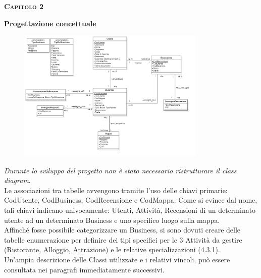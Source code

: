 \documentclass[a4paper,12pt]{article}
\begin{document}
\newpage 


\newpage\null{}\setcounter{page}{6}
\begin{flushleft}

\vspace*{+1cm}
\Large\textsc{\bf Capitolo 2}
\vspace*{+1cm}

\begingroup
\fontsize{30pt}{12pt}\selectfont\bf{Progettazione concettuale}
\endgroup
\vspace*{+1cm}
\end{flushleft}

\begin{center}
	\begin{figure}[h]
	\centering
 	\includegraphics[width=0.8\textwidth]{classDiagram.png}
	\end{figure}

\end{center}

\normalsize{
{\small \it* Durante lo sviluppo del progetto non è stato necessario ristrutturare il  class diagram}.
\vspace*{+0.2cm}
\\Le associazioni tra tabelle avvengono tramite l'uso delle chiavi primarie: CodUtente, CodBusiness, CodRecensione e CodMappa. Come si evince dal nome, tali chiavi indicano univocamente: Utenti, Attività, Recensioni di un determinato utente ad un determinato Business e uno specifico luogo sulla mappa.
\vspace*{+0.2cm}
\\Affinché fosse possibile categorizzare un Business, si sono dovuti creare delle tabelle enumerazione per definire dei tipi specifici per le 3 Attività da gestire (Ristorante, Alloggio, Attrazione) e le relative specializzazioni (4.3.1).
\vspace*{+0.2cm}
\\Un'ampia descrizione delle Classi utilizzate e i relativi vincoli, può essere consultata nei paragrafi immediatamente successivi.
}
\end{document}
